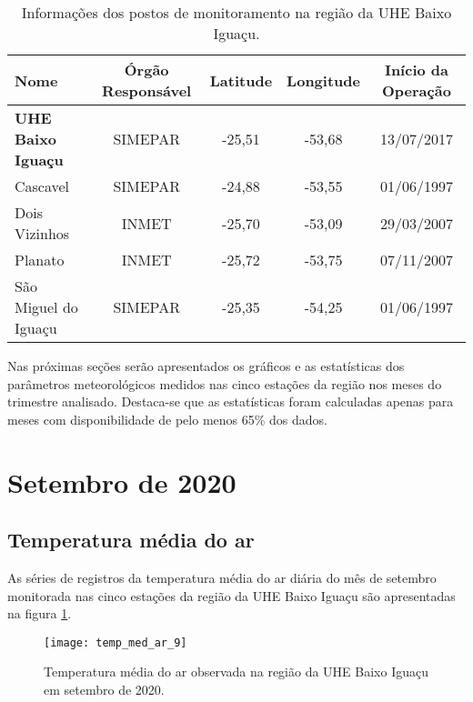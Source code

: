 \documentclass[a4paper,12pt]{article}
\begin{document}
\begin{table}[!hbt]
\centering
\caption{Informações dos postos de monitoramento na região da UHE Baixo Iguaçu.}
\begin{tabular}{lcccc}
\hline
Nome                           & Órgão Responsável & Latitude & Longitude & Início da Operação \\
\hline
\textbf{UHE Baixo Iguaçu}     & SIMEPAR           & -25,51   & -53,68    & 13/07/2017         \\
Cascavel                       & SIMEPAR           & -24,88   & -53,55    & 01/06/1997         \\
Dois Vizinhos                  & INMET             & -25,70   & -53,09    & 29/03/2007         \\
Planato                        & INMET             & -25,72   & -53,75    & 07/11/2007         \\
São Miguel do Iguaçu           & SIMEPAR           & -25,35   & -54,25    & 01/06/1997         \\
\hline
\end{tabular} \label{tab:tabelaestacoes}
\end{table}

Nas próximas seções serão apresentados os gráficos e as estatísticas dos parâmetros meteorológicos medidos nas cinco estações da região nos meses do trimestre analisado.
Destaca-se que as estatísticas foram calculadas apenas para meses com disponibilidade de pelo menos 65\% dos dados.

\newpage
\section{Setembro de 2020}

 
                   \subsection{Temperatura média do ar}
                   
                   \hspace{0.5cm} As séries de registros da temperatura média do ar diária do mês de setembro monitorada nas cinco estações da região da UHE Baixo Iguaçu são apresentadas na
                   figura \ref{fig:figtemp_med_ar_9}.    
    

    \begin{figure}[!htb]
    \texttt{[image: temp\_med\_ar\_9]}
    \caption{Temperatura média do ar observada na região da UHE Baixo Iguaçu em setembro de 2020.}
    \label{fig:figtemp_med_ar_9}
    \end{figure}
\end{document}
